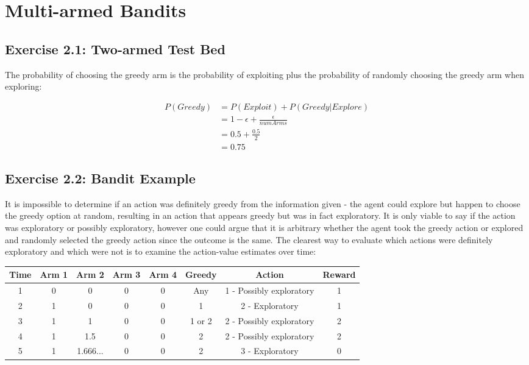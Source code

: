\section{Multi-armed Bandits}

\subsection*{Exercise 2.1: Two-armed Test Bed}

The probability of choosing the greedy arm is the probability of exploiting plus the probability of randomly choosing the greedy arm when exploring:

\vspace{-6mm}
\begin{align}
P(Greedy) &= P(Exploit) + P(Greedy | Explore) \nonumber \\
 &= 1 - \epsilon + \frac{\epsilon}{numArms} \label{eqn:2_pgreedy} \\
 &= 0.5 + \frac{0.5}{2} \nonumber \\
 &= 0.75 \nonumber
\end{align}

\subsection*{Exercise 2.2: Bandit Example}

It is impossible to determine if an action was definitely greedy from the information given - the agent could explore but happen to choose the greedy option at random, resulting in an action that appears greedy but was in fact exploratory. It is only viable to say if the action was exploratory or possibly exploratory, however one could argue that it is arbitrary whether the agent took the greedy action or explored and randomly selected the greedy action since the outcome is the same. The clearest way to evaluate which actions were definitely exploratory and which were not is to examine the action-value estimates over time:

\vspace{-6mm}
\begin{center}
\renewcommand{\arraystretch}{1.2}
\begin{tabular}{c|c|c|c|c|c|c|c}
    \textbf{Time} & \textbf{Arm 1} & \textbf{Arm 2} & \textbf{Arm 3} & \textbf{Arm 4} & \textbf{Greedy} & \textbf{Action} & \textbf{Reward} \\ 
	\hline 
	1 & 0 & 0 & 0 & 0 & Any & 1 - Possibly exploratory & 1 \\ 
	\hline 
	2 & 1 & 0 & 0 & 0 & 1 & 2 - Exploratory & 1  \\ 
	\hline 
	3 & 1 & 1 & 0 & 0 & 1 or 2 & 2 - Possibly exploratory & 2 \\ 
	\hline 
	4 & 1 & 1.5 & 0 & 0 & 2 & 2 - Possibly exploratory & 2 \\ 
	\hline 
	5 & 1 & 1.666... & 0 & 0 & 2 & 3 - Exploratory & 0 \\ 
\end{tabular}  
\end{center}

